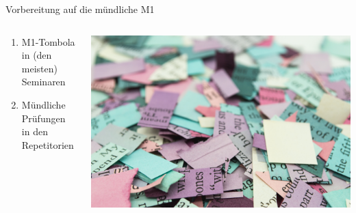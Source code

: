 \documentclass{beamer}
\begin{document}
\begin{frame}{Vorbereitung auf die mündliche M1}

\begin{columns}[c]
    \begin{column}{5cm}
\begin{enumerate}
    \item 
    M1-Tombola in (den meisten) Seminaren
    \item 
    Mündliche Prüfungen in den Repetitorien
\end{enumerate}
        
    \end{column}

    \begin{column}{5cm}
\includegraphics[width=\textwidth]{mel-poole-gT-Sob4njj8-unsplash.jpg}        
    \end{column}

\end{columns}





    
\end{frame}
\end{document}
